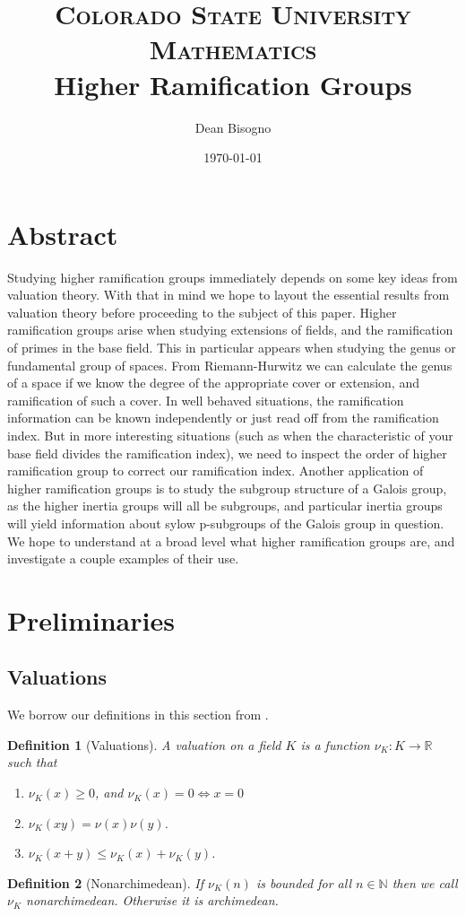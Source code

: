\documentclass[paper=a4, fontsize=11pt]{scrartcl} %
\title{	
\normalfont \normalsize 
\textsc{Colorado State University Mathematics} \\ [25pt] %
\huge Higher Ramification Groups \\ %
}
\author{Dean Bisogno} %
\date{\normalsize\today} %
\numberwithin{equation}{section} %
\numberwithin{figure}{section} %
\numberwithin{table}{section} %
\theoremstyle{break}
\newtheorem{defn}{Definition}
\begin{document}
\maketitle %
\section{Abstract}
Studying higher ramification groups immediately depends on some key ideas from valuation theory. With that in mind we hope to layout the essential results from valuation theory before proceeding to the subject of this paper. Higher ramification groups arise when studying extensions of fields, and the ramification of primes in the base field. This in particular appears when studying the genus or fundamental group of spaces. From Riemann-Hurwitz we can calculate the genus of a space if we know the degree of the appropriate cover or extension, and ramification of such a cover. In well behaved situations, the ramification information can be known independently or just read off from the ramification index. But in more interesting situations (such as when the characteristic of your base field divides the ramification index), we need to inspect the order of higher ramification group to correct our ramification index. Another application of higher ramification groups is to study the subgroup structure of a Galois group, as the higher inertia groups will all be subgroups, and particular inertia groups will yield information about sylow p-subgroups of the Galois group in question. We hope to understand at a broad level what higher ramification groups are, and investigate a couple examples of their use.
\section{Preliminaries}
\subsection{Valuations}
We borrow our definitions in this section from \cite{Neukirch}. 
\begin{defn}[Valuations]
A valuation on a field $K$ is a function $\nu_K: K \to \mathbb{R}$ such that
\begin{enumerate}
\item $\nu_K(x) \geq 0$, and $\nu_K(x)= 0 \Leftrightarrow x =0$
\item $\nu_K(xy) = \nu(x)\nu(y)$.
\item $\nu_K(x+y) \leq \nu_K(x) + \nu_K(y)$.
\end{enumerate}
\end{defn}
\begin{defn}[Nonarchimedean]
If $\nu_K(n)$ is bounded for all $n \in \mathbb{N}$ then we call $\nu_K$ nonarchimedean. Otherwise it is archimedean.
\end{defn}
\end{document}

